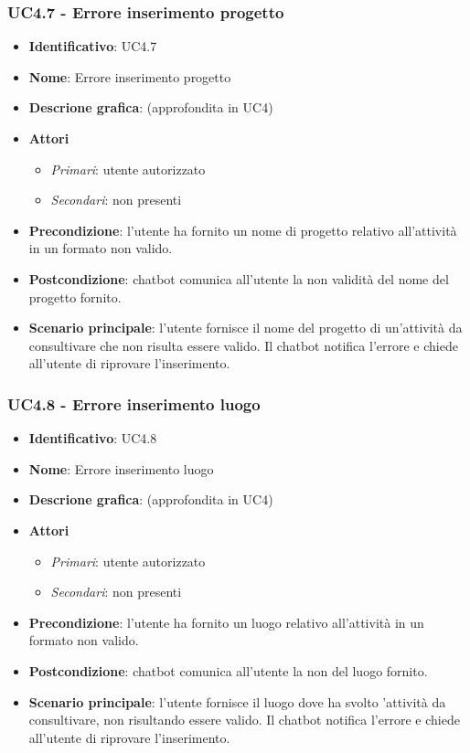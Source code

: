 \subsubsection{UC4.7 - Errore inserimento progetto}
\begin{itemize}
    \item \textbf{Identificativo}: UC4.7
    \item \textbf{Nome}: Errore inserimento progetto
    \item \textbf{Descrione grafica}: (approfondita in UC4)
    \item \textbf{Attori}
        \begin{itemize} 
            \item \textit{Primari}: utente autorizzato
            \item \textit{Secondari}: non presenti
        \end{itemize}
    \item \textbf{Precondizione}: l'utente ha fornito un nome di progetto relativo all'attività in un formato non valido. 
    \item \textbf{Postcondizione}: chatbot comunica all'utente la non validità del nome del progetto fornito.
    \item \textbf{Scenario principale}: l'utente fornisce il nome del progetto di un'attività da consultivare che non risulta essere valido. Il chatbot notifica l'errore e chiede all'utente di riprovare l'inserimento. 
\end{itemize}

\subsubsection{UC4.8 - Errore inserimento luogo}
\begin{itemize}
    \item \textbf{Identificativo}: UC4.8
    \item \textbf{Nome}: Errore inserimento luogo
    \item \textbf{Descrione grafica}: (approfondita in UC4)
    \item \textbf{Attori}
        \begin{itemize} 
            \item \textit{Primari}: utente autorizzato
            \item \textit{Secondari}: non presenti
        \end{itemize}
    \item \textbf{Precondizione}: l'utente ha fornito un luogo relativo all'attività in un formato non valido. 
    \item \textbf{Postcondizione}: chatbot comunica all'utente la non del luogo fornito.
    \item \textbf{Scenario principale}: l'utente fornisce il luogo dove ha svolto 'attività da consultivare, non risultando essere valido. Il chatbot notifica l'errore e chiede all'utente di riprovare l'inserimento. 
\end{itemize}